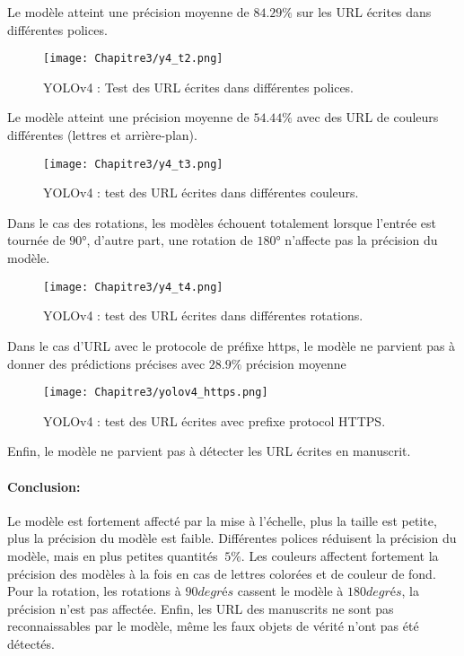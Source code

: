     Le modèle atteint une précision moyenne de $84.29\%$ sur les URL écrites dans différentes polices.
     \begin{figure}[H]
               \centering
               \texttt{[image: Chapitre3/y4\_t2.png]}
               \caption{YOLOv4 : Test des URL écrites dans différentes polices.}
               \label{y4_t2}
               \end{figure}

     Le modèle atteint une précision moyenne de $54.44\%$ avec des URL de couleurs différentes (lettres et arrière-plan).
     \begin{figure}[H]
               \centering
               \texttt{[image: Chapitre3/y4\_t3.png]}
               \caption{YOLOv4 : test des URL écrites dans différentes couleurs.}
               \label{y4_t3}
               \end{figure}

     Dans le cas des rotations, les modèles échouent totalement lorsque l'entrée est tournée de $90°$, d'autre part, une rotation de $180°$ n'affecte pas la précision du modèle.
     \begin{figure}[H]
               \centering
               \texttt{[image: Chapitre3/y4\_t4.png]}
               \caption{YOLOv4 : test des URL écrites dans différentes rotations.}
               \label{y4_t4}
               \end{figure}
     
     Dans le cas d'URL avec le protocole de préfixe https, le modèle ne parvient pas à donner des prédictions précises avec $28.9\%$ précision moyenne
     \begin{figure}[H]
               \centering
               \texttt{[image: Chapitre3/yolov4\_https.png]}
               \caption{YOLOv4 : test des URL écrites avec prefixe protocol HTTPS.}
               \label{y4_https}
               \end{figure}
     
     Enfin, le modèle ne parvient pas à détecter les URL écrites en manuscrit.
     \paragraph{Conclusion:} Le modèle est fortement affecté par la mise à l'échelle, plus la taille est petite, plus la précision du modèle est faible. Différentes polices réduisent la précision du modèle, mais en plus petites quantités $~ 5\%$. Les couleurs affectent fortement la précision des modèles à la fois en cas de lettres colorées et de couleur de fond. Pour la rotation, les rotations à $90 degrés$ cassent le modèle à $180 degrés$, la précision n'est pas affectée. Enfin, les URL des manuscrits ne sont pas reconnaissables par le modèle, même les faux objets de vérité n'ont pas été détectés.
     
